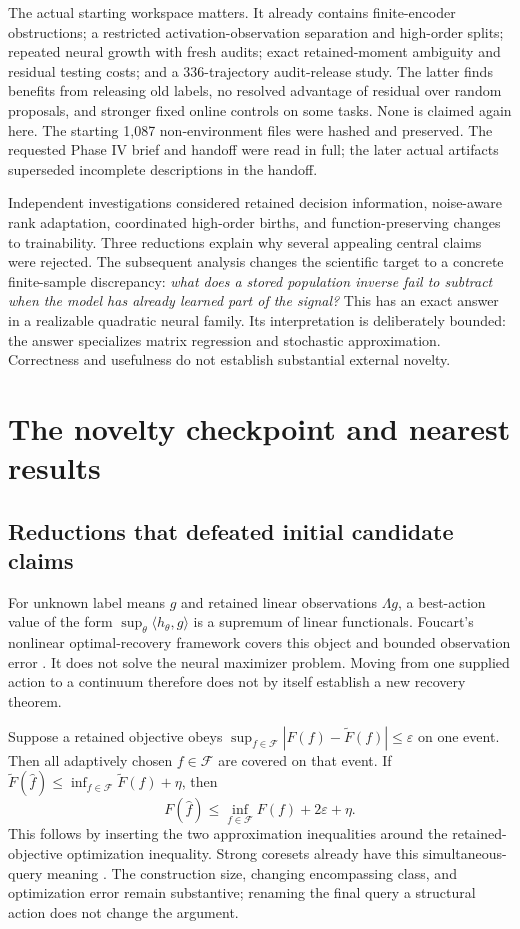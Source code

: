 \documentclass[11pt]{article}
\theoremstyle{remark}\newtheorem{remark}[theorem]{Remark}
\begin{document}
The actual starting workspace matters. It already contains finite-encoder
obstructions; a restricted activation-observation separation and high-order
splits; repeated neural growth with fresh audits; exact retained-moment
ambiguity and residual testing costs; and a 336-trajectory audit-release
study. The latter finds benefits from releasing old labels, no resolved
advantage of residual over random proposals, and stronger fixed online
controls on some tasks. None is claimed again here. The starting
1,087 non-environment files were hashed and preserved. The requested
Phase IV brief and handoff were read in full; the later actual artifacts
superseded incomplete descriptions in the handoff.

Independent investigations considered retained decision information,
noise-aware rank adaptation, coordinated high-order births, and
function-preserving changes to trainability. Three reductions explain why
several appealing central claims were rejected. The subsequent analysis
changes the scientific target to a concrete finite-sample discrepancy:
\emph{what does a stored population inverse fail to subtract when the model
has already learned part of the signal?} This has an exact answer in a
realizable quadratic neural family. Its interpretation is deliberately
bounded: the answer specializes matrix regression and stochastic
approximation. Correctness and usefulness do not establish substantial
external novelty.

\section{The novelty checkpoint and nearest results}
\label{sec:prior}
\subsection{Reductions that defeated initial candidate claims}
For unknown label means $g$ and retained linear observations $\Lambda g$, a
best-action value of the form $\sup_\theta\langle h_\theta,g\rangle$ is a
supremum of linear functionals. Foucart's nonlinear optimal-recovery
framework covers this object and bounded observation error
\cite[Theorems 1, 3; Section 2.3]{foucart}. It does not solve the neural
maximizer problem. Moving from one supplied action to a continuum therefore
does not by itself establish a new recovery theorem.

Suppose a retained objective obeys
$\sup_{f\in\mathcal F}|F(f)-\widetilde F(f)|\le\varepsilon$ on one event.
Then all adaptively chosen $f\in\mathcal F$ are covered on that event. If
$\widetilde F(\hat f)\le\inf_{f\in\mathcal F}\widetilde F(f)+\eta$, then
\[
 F(\hat f)\le\inf_{f\in\mathcal F}F(f)+2\varepsilon+\eta.
\]
This follows by inserting the two approximation inequalities around the
retained-objective optimization inequality. Strong coresets already have
this simultaneous-query meaning \cite{coresets}. The construction size,
changing encompassing class, and optimization error remain substantive;
renaming the final query a structural action does not change the argument.
\end{document}
